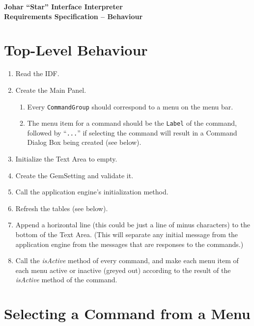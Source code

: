 \documentclass[11pt]{article}
\begin{document}
\begin{center} \bf \Large
Johar ``Star'' Interface Interpreter \\
Requirements Specification -- Behaviour
\end{center}

\section{Top-Level Behaviour}

\begin{enumerate}
\item Read the IDF.
\item Create the Main Panel.
  \begin{enumerate}
  \item Every {\tt CommandGroup} should correspond to a menu on the
    menu bar.
  \item The menu item for a command should be the {\tt Label}
    of the command, followed by ``{\tt ...}'' if selecting the 
    command will result in a Command Dialog Box being created (see below).
  \end{enumerate}
\item Initialize the Text Area to empty.
\item Create the GemSetting and validate it.
\item Call the application engine's initialization method.
\item Refresh the tables (see below).
\item Append a horizontal line (this could be just a line of minus
  characters) to the bottom of the Text Area.  (This will separate any
  initial message from the application engine from the messages that are
  responses to the commands.)
\item Call the {\it isActive} method of every command, and make each menu
  item of each menu active or inactive (greyed out) according to the
  result of the {\it isActive} method of the command.
\end{enumerate}

\section{Selecting a Command from a Menu}
\end{document}
